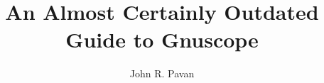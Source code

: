 \documentclass{book}
\title{An Almost Certainly Outdated Guide to Gnuscope}
\author{John R. Pavan}
\begin{document}
\titlepage
\maketitle
\tableofcontents
\listoftables
\listoffigures
\newpage

%
\end{document}
